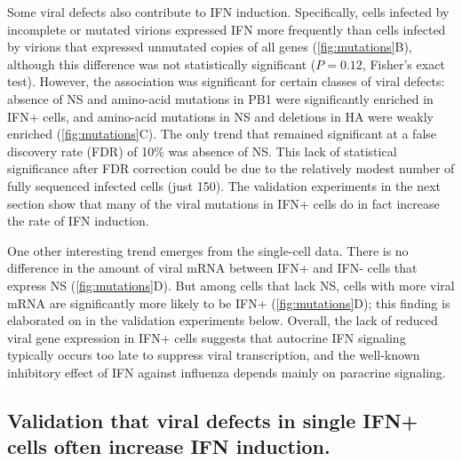 \documentclass[]{asm-article}
\newcommand{\FIG}[1]{\autoref{fig:#1}}
\begin{document}
Some viral defects also contribute to IFN induction.
Specifically, cells infected by incomplete or mutated virions expressed IFN more frequently than cells infected by virions that expressed unmutated copies of all genes (\FIG{mutations}B), although this difference was not statistically significant ($P = 0.12$, Fisher's exact test).
However, the association was significant for certain classes of viral defects: absence of NS and amino-acid mutations in PB1 were significantly enriched in IFN+ cells, and amino-acid mutations in NS and deletions in HA were weakly enriched (\FIG{mutations}C).
The only trend that remained significant at a false discovery rate (FDR) of 10\% was absence of NS.
This lack of statistical significance after FDR correction could be due to the relatively modest number of fully sequenced infected cells (just 150).
The validation experiments in the next section show that many of the viral mutations in IFN+ cells do in fact increase the rate of IFN induction.

One other interesting trend emerges from the single-cell data.
There is no difference in the amount of viral mRNA between IFN+ and IFN- cells that express NS (\FIG{mutations}D).
But among cells that lack NS, cells with more viral mRNA are significantly more likely to be IFN+ (\FIG{mutations}D); this finding is elaborated on in the validation experiments below.
Overall, the lack of reduced viral gene expression in IFN+ cells suggests that autocrine IFN signaling typically occurs too late to suppress viral transcription, and the well-known inhibitory effect of IFN against influenza depends mainly on paracrine signaling.

\subsection{Validation that viral defects in single IFN+ cells often increase IFN induction.}
\end{document}
